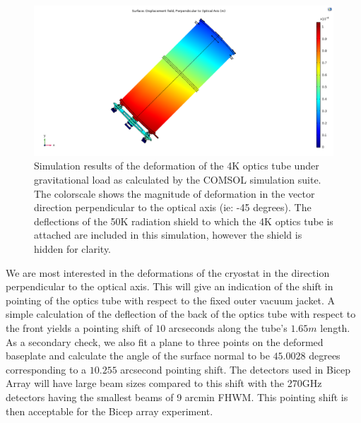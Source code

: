 \documentclass[12pt]{article}
\begin{document}
\begin{figure}
	\center
	\includegraphics[width=.9\textwidth]{disp_45_perp_4_shell.png}
	\caption{Simulation results of the deformation of the 4K optics tube under
	gravitational load as calculated by the COMSOL simulation suite. The
	colorscale shows the magnitude of deformation in the vector direction
	perpendicular to the optical axis (ie: -45 degrees). The deflections of
	the 50K radiation shield to which the 4K optics tube is attached are
	included in this simulation, however the shield is hidden for clarity.}
	\label{fig:pointing}
\end{figure}



We are most interested in the deformations of the cryostat in the direction
perpendicular to the optical axis. This will give an indication of the shift
in pointing of the optics tube with respect to the fixed outer vacuum jacket.
A simple calculation of the deflection of the back of the optics tube with
respect to the front yields a pointing shift of $10$ arcseconds along the
tube's $1.65 m$ length. As a secondary check, we also fit a plane to three
points on the deformed baseplate and calculate the angle of the surface normal
to be $45.0028$ degrees corresponding to a $10.255$ arcsecond pointing shift.
The detectors used in Bicep Array will have large beam sizes compared to this
shift with the 270GHz detectors having the smallest beams of 9 arcmin FHWM.
This pointing shift is then acceptable for the Bicep array experiment.
\end{document}
